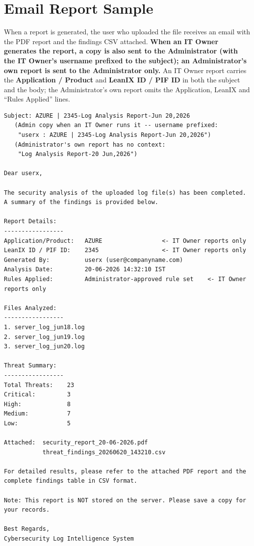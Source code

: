\documentclass[12pt,a4paper]{article}
\begin{document}
\newpage
\section{Email Report Sample}

When a report is generated, the user who uploaded the file receives an email with the PDF report and the findings CSV attached. \textbf{When an IT Owner generates the report, a copy is also sent to the Administrator (with the IT Owner's username prefixed to the subject); an Administrator's own report is sent to the Administrator only.} An IT Owner report carries the \textbf{Application / Product} and \textbf{LeanIX ID / PIF ID} in both the subject and the body; the Administrator's own report omits the Application, LeanIX and ``Rules Applied'' lines.

\begin{small}
\begin{verbatim}
Subject: AZURE | 2345-Log Analysis Report-Jun 20,2026
   (Admin copy when an IT Owner runs it -- username prefixed:
    "userx : AZURE | 2345-Log Analysis Report-Jun 20,2026")
   (Administrator's own report has no context:
    "Log Analysis Report-20 Jun,2026")

Dear userx,

The security analysis of the uploaded log file(s) has been completed.
A summary of the findings is provided below.

Report Details:
-----------------
Application/Product:   AZURE                 <- IT Owner reports only
LeanIX ID / PIF ID:    2345                  <- IT Owner reports only
Generated By:          userx (user@companyname.com)
Analysis Date:         20-06-2026 14:32:10 IST
Rules Applied:         Administrator-approved rule set    <- IT Owner reports only

Files Analyzed:
-----------------
1. server_log_jun18.log
2. server_log_jun19.log
3. server_log_jun20.log

Threat Summary:
-----------------
Total Threats:    23
Critical:         3
High:             8
Medium:           7
Low:              5

Attached:  security_report_20-06-2026.pdf
           threat_findings_20260620_143210.csv

For detailed results, please refer to the attached PDF report and the
complete findings table in CSV format.

Note: This report is NOT stored on the server. Please save a copy for your records.

Best Regards,
Cybersecurity Log Intelligence System
\end{verbatim}
\end{small}
\end{document}
